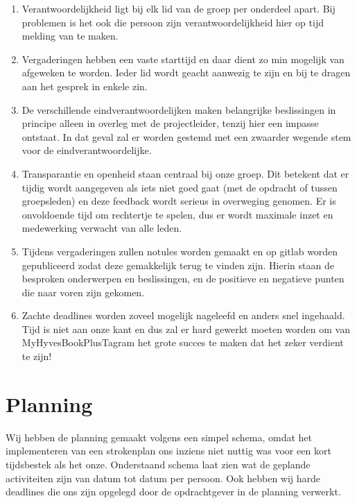 \documentclass{uva-inf-article}
\begin{document}
\begin{enumerate}
\item Verantwoordelijkheid ligt bij elk lid van de groep per onderdeel apart.
Bij problemen is het ook die persoon zijn verantwoordelijkheid hier op tijd melding van te maken.
\item Vergaderingen hebben een vaste starttijd en daar dient zo min mogelijk van afgeweken te worden. Ieder lid wordt geacht aanwezig te zijn en bij te dragen aan het gesprek in enkele zin.
\item De verschillende eindverantwoordelijken maken belangrijke beslissingen in principe alleen in overleg met de projectleider, tenzij hier een impasse ontstaat. In dat geval zal er worden gestemd met een zwaarder wegende stem voor de eindverantwoordelijke.
\item Transparantie en openheid staan centraal bij onze groep. Dit betekent dat er tijdig wordt aangegeven als iets niet goed gaat (met de opdracht of tussen groepsleden) en deze feedback wordt serieus in overweging genomen. Er is onvoldoende tijd om rechtertje te spelen, dus er wordt maximale inzet en medewerking verwacht van alle leden.
\item Tijdens vergaderingen zullen notules worden gemaakt en op gitlab worden gepubliceerd zodat deze gemakkelijk terug te vinden zijn. Hierin staan de besproken onderwerpen en beslissingen, en de positieve en negatieve punten die naar voren zijn gekomen.
\item Zachte deadlines worden zoveel mogelijk nageleefd en anders snel ingehaald. Tijd is niet aan onze kant en dus zal er hard gewerkt moeten worden om van MyHyvesBookPlusTagram het grote succes te maken dat het zeker verdient te zijn!
\end{enumerate}

\section{Planning}

Wij hebben de planning gemaakt volgens een simpel schema, omdat het implementeren van een strokenplan ons inziens niet nuttig was voor een kort tijdsbestek als het onze. Onderstaand schema laat zien wat de geplande activiteiten zijn van datum tot datum per persoon. Ook hebben wij harde deadlines die ons zijn opgelegd door de opdrachtgever in de planning verwerkt.
\end{document}
